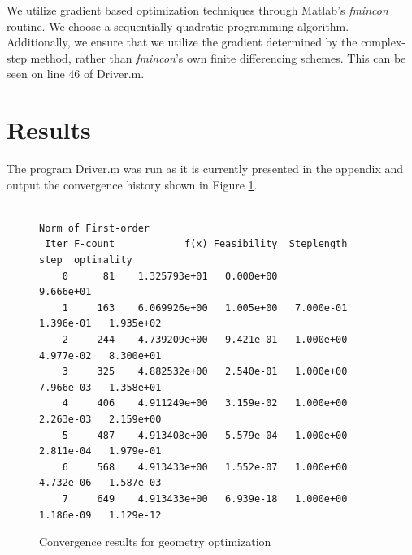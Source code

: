 \documentclass[11pt]{article}
\begin{document}
We utilize gradient based optimization techniques through
Matlab's \emph{fmincon} routine. We choose a
sequentially quadratic programming algorithm.
Additionally, we ensure that we utilize the gradient
determined by the complex-step method, rather than
\emph{fmincon}'s own finite differencing schemes.
This can be seen on line $46$ of Driver.m.

\section{Results}

The program Driver.m was run as it is currently presented
in the appendix and output the convergence history shown
in Figure \ref{fig:convergence}.

\begin{figure}[hbt]
\small
\centering
\begin{verbatim}
                                                         Norm of First-order
 Iter F-count            f(x) Feasibility  Steplength        step  optimality
    0      81    1.325793e+01   0.000e+00                           9.666e+01
    1     163    6.069926e+00   1.005e+00   7.000e-01   1.396e-01   1.935e+02
    2     244    4.739209e+00   9.421e-01   1.000e+00   4.977e-02   8.300e+01
    3     325    4.882532e+00   2.540e-01   1.000e+00   7.966e-03   1.358e+01
    4     406    4.911249e+00   3.159e-02   1.000e+00   2.263e-03   2.159e+00
    5     487    4.913408e+00   5.579e-04   1.000e+00   2.811e-04   1.979e-01
    6     568    4.913433e+00   1.552e-07   1.000e+00   4.732e-06   1.587e-03
    7     649    4.913433e+00   6.939e-18   1.000e+00   1.186e-09   1.129e-12
\end{verbatim}
\caption{Convergence results for geometry optimization}
\label{fig:convergence}
\end{figure}
\end{document}
